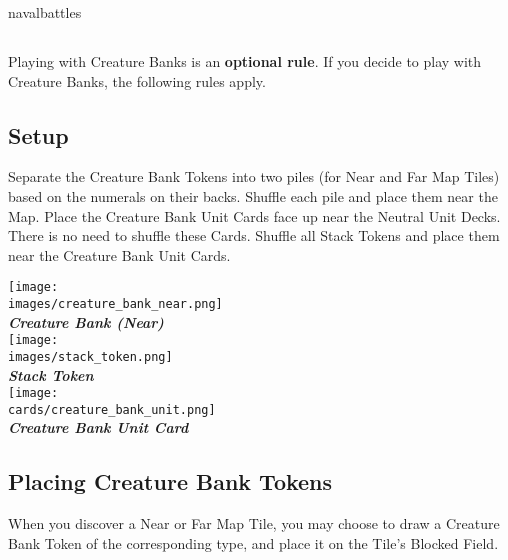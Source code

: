 \begin{expansion}[before=\vspace*{-11mm}]{navalbattles}
  \begin{multicols*}{2}
  \subsection*{}
  Playing with Creature Banks is an \textbf{optional rule}.
  If you decide to play with Creature Banks, the following rules apply.

  \bigskip
  \subsection*{Setup}
  Separate the Creature Bank Tokens into two piles (for Near and Far Map Tiles) based on the numerals on their backs.
  Shuffle each pile and place them near the Map.
  Place the Creature Bank Unit Cards face up near the Neutral Unit Decks.
  There is no need to shuffle these Cards.
  Shuffle all Stack Tokens and place them near the Creature Bank Unit Cards.

  \bigskip
  \begin{multicols*}{2}
    \begin{center}
      \texttt{[image: \\images/creature\_bank\_near.png]}\\
      \vspace{-0.5em}\textbf{\footnotesize\textit{\textcolor{darkcandyapplered}{Creature Bank (Near)}}}\\
      \vspace*{\fill}
      \texttt{[image: \\images/stack\_token.png]}\\
      \textbf{\footnotesize\textit{\textcolor{darkcandyapplered}{Stack Token}}}\\
      \columnbreak
      \texttt{[image: \\cards/creature\_bank\_unit.png]}\\
      \textbf{\footnotesize\textit{\textcolor{darkcandyapplered}{Creature Bank Unit Card}}}
    \end{center}
  \end{multicols*}

  \subsection*{Placing Creature Bank Tokens}
  When you discover a Near or Far Map Tile, you may choose to draw a Creature Bank Token of the corresponding type, and place it on the Tile's Blocked Field.\par


\end{multicols*}
\end{expansion}
